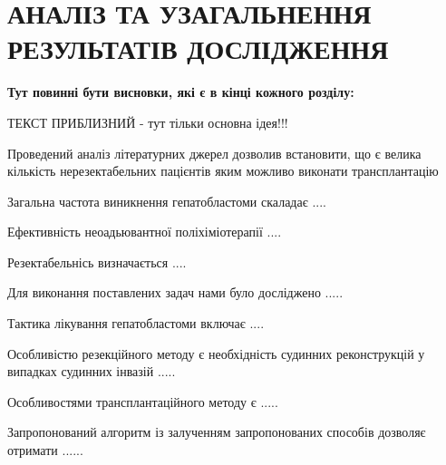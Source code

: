 \chapter{АНАЛІЗ ТА УЗАГАЛЬНЕННЯ РЕЗУЛЬТАТІВ ДОСЛІДЖЕННЯ}

\textbf{Тут повинні бути висновки, які є в кінці кожного розділу:}

ТЕКСТ ПРИБЛИЗНИЙ - тут тільки основна ідея!!!

Проведений аналіз літературних джерел дозволив встановити, що є велика кількість нерезектабельних пацієнтів яким можливо виконати трансплантацію

Загальна частота виникнення гепатобластоми скаладає .... 

Ефективність неоадьювантної поліхіміотерапії ....

Резектабельнісь визначається ....

Для виконання поставлених задач нами було досліджено .....

Тактика лікування гепатобластоми включає ....

Особливістю резекційного методу є необхідність судинних реконструкцій у випадках судинних інвазій .....

Особливостями трансплантаційного методу є .....

Запропонований алгоритм із залученням запропонованих способів дозволяє отримати ......


